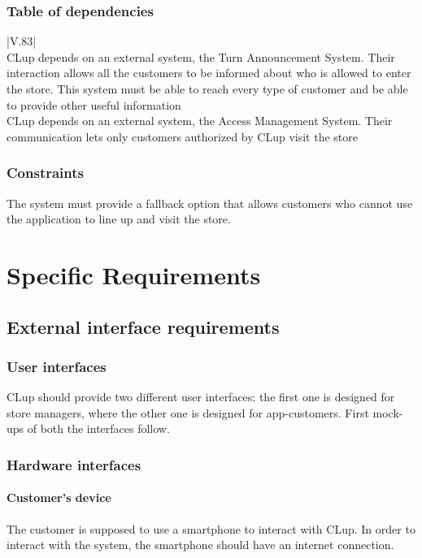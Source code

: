 \documentclass[a4paper,oneside,11pt]{book}   %
\begin{document}
    \subsection{Table of dependencies}
    \begin{longtable}[c] {|V{.83\textwidth}|}
        \hline
         \\
        \hline
        CLup depends on an external system, the Turn Announcement System. Their interaction allows all the customers to be informed about who is allowed to enter the store. This system must be able to reach every type of customer and be able to provide other useful information \\ \hline
        CLup depends on an external system, the Access Management System. Their communication lets only customers authorized by CLup visit the store \\
        \hline
        \caption{Table of dependencies}
        \label{table:dependencies}
    \end{longtable}
    
    \subsection{Constraints} 
    The system must provide a fallback option that allows customers who cannot use the application to line up and visit the store.
    
    
\chapter{Specific Requirements}
    \section{External interface requirements}
    \subsection{User interfaces}
    CLup should provide two different user interfaces: the first one is designed for store managers, where the other one is designed for app-customers. First mock-ups of both the interfaces follow.
    
    \subsection{Hardware interfaces}
    \subsubsection{Customer's device} 
    The customer is supposed to use a smartphone to interact with CLup. In order to interact with the system, the smartphone should have an internet connection.
    
\end{document}

